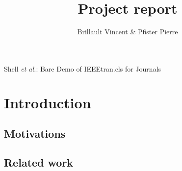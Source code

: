 \documentclass[journal]{IEEEtran}
\begin{document}
\title{Project report}

\author{Brillault Vincent \& Pfister Pierre}%


%
{Shell \MakeLowercase{\textit{et al.}}: Bare Demo of IEEEtran.cls for Journals}
\maketitle





\begin{abstract}
\boldmath
\end{abstract}
%






\section{Introduction}




 

\subsection{Motivations}





\subsection{Related work}
\end{document}
